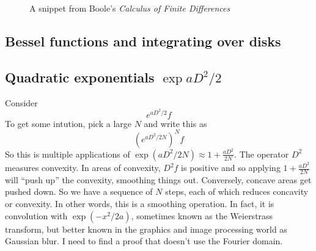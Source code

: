 \documentclass[a4paper]{article}
\theoremstyle{definition}
\begin{document}
\begin{figure}
\centering
{}
\caption{A snippet from Boole's \emph{Calculus of Finite Differences}}
\end{figure}

\subsection{Bessel functions and integrating over disks}

\subsection{Quadratic exponentials $\exp{aD^2/2}$}
Consider
\[
e^{aD^2/2}f
\]
To get some intution, pick a large $N$ and write this as
\[
(e^{aD^2/2N})^Nf
\]
So this is multiple applications of $\exp(aD^2/2N) \approx 1+\frac{aD^2}{2N}$.
The operator $D^2$ measures convexity.
In areas of convexity, $D^2f$ is positive and so applying $1+\frac{aD^2}{2N}$ will ``push up'' the convexity, smoothing things out.
Conversely, concave areas get pushed down.
So we have a sequence of $N$ steps, each of which reduces concavity or convexity.
In other words, this is a smoothing operation.
In fact, it is convolution with $\exp(-x^2/2a)$, sometimes known as the Weierstrass transform, but better known in the graphics and image processing world as Gaussian blur.
I need to find a proof that doesn't use the Fourier domain.
\end{document}
